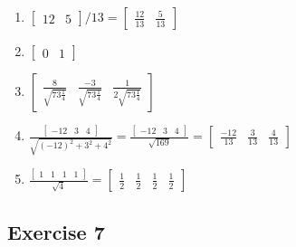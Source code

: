 \documentclass[11pt]{article}
\begin{document}
\begin{enumerate}

	\item %
$
\begin{bmatrix}
12 & 5
\end{bmatrix}/13
=
\begin{bmatrix}
\frac{12}{13} & \frac{5}{13}
\end{bmatrix}
$
	\item %
$
\begin{bmatrix}
0 & 1
\end{bmatrix}
$
	\item %
$
\begin{bmatrix}
\frac{8}{\sqrt{73\frac{1}{4}}} & \frac{-3}{\sqrt{73\frac{1}{4}}} & \frac{1}{2\sqrt{73\frac{1}{4}}}
\end{bmatrix}
$	
	\item %
$
\frac{\begin{bmatrix}
-12 & 3 & 4
\end{bmatrix}}{\sqrt{(-12)^2+3^2+4^2}}=
\frac{\begin{bmatrix}
-12 & 3 & 4
\end{bmatrix}}{\sqrt{169}}=
\begin{bmatrix}
\frac{-12}{13} & \frac{3}{13} & \frac{4}{13}
\end{bmatrix}
$
	\item %
	$
\frac{\begin{bmatrix}
1 & 1 & 1 & 1
\end{bmatrix}}{\sqrt{4}}=
\begin{bmatrix}
\frac{1}{2} & \frac{1}{2} & \frac{1}{2} & \frac{1}{2}
\end{bmatrix}
$
\end{enumerate}

\subsection{Exercise 7}
\end{document}
